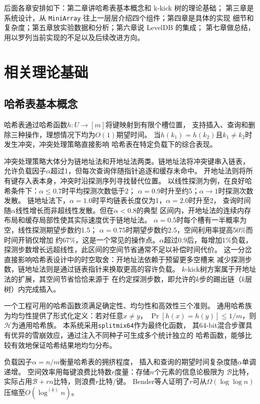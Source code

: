 \documentclass[
    type = bachelor,
    fontset = win,
    decl-page = true,
  ]{njuthesis}
\begin{document}
后面各章安排如下：第二章讲哈希表基本概念和 k-kick 树的理论基础；
第三章是系统设计，从 \texttt{MiniArray} 往上一层层介绍四个组件；第四章是具体的实现
细节和复杂度；第五章放实验数据和分析；第六章说 LevelDB 的集成；
第七章做总结，用以罗列当前实现的不足以及后续改进方向。

\chapter{相关理论基础}

\section{哈希表基本概念}

哈希表通过哈希函数$h: U \rightarrow [m]$将键映射到有限个槽位置，
支持插入、查询和删除三种操作，理想情况下均为$O(1)$期望时间。
当$h(k_1)=h(k_2)$且$k_1\neq k_2$时发生冲突，冲突处理策略直接影响
哈希表在特定负载下的综合表现。

冲突处理策略大体分为链地址法和开地址法两类。链地址法将冲突键串入链表，
允许负载因子$\alpha$超过1，但每次查询伴随指针追逐和缓存未命中。
开地址法则将所有键存入表本身，冲突时沿探测序列寻找替代位置。
以线性探测为例，在良好哈希条件下：$\alpha\le 0.7$时平均探测次数低于2；
$\alpha=0.9$时升至约5；$\alpha\to 1$时探测次数发散\cite{22}。
链地址法下，$\alpha=1.0$时平均链表长度仅为1，$\alpha=2.0$时升至2，
查询时间随$\alpha$线性增长而非超线性发散。但在$\alpha<0.8$的典型
区间内，开地址法的连续内存布局和缓存局部性使其实际速度优于链地址法。
$\alpha=0.5$时每个槽有一半概率为空，线性探测期望步数约1.5；
$\alpha=0.75$时期望步数约2.5，空间利用率提高50\%而时间开销仅增加
约67\%，这是一个常见的操作点。$\alpha$超过0.9后，每增加1\%负载，
探测步数增长远超线性，此区间的空间节省通常不足以补偿时间代价。
这一分岔直接影响哈希表设计中的时空取舍：开地址法依赖于预留更多空槽来
减少探测步数，链地址法则是通过链表指针来换取更高的容许负载。
$k$-kick树方案\cite{1}属于开地址法的扩展，其空间节省恰恰来源于
在约定探测步数，即允许的$k$步的踢出链（$k$层树）内完成插入。

一个工程可用的哈希函数须满足确定性、均匀性和高效性三个准则。
通用哈希族\cite{9,20}为均匀性提供了形式化定义：若对任意$x\neq y$，
$\Pr[h(x)=h(y)]\le 1/m$，则$\mathcal{H}$为通用哈希族。
本系统采用\texttt{splitmix64}\cite{5}作为最终化函数，
其64-bit混合步骤具有优异的雪崩效应\cite{21}，通过注入不同种子可生成多个统计独立的
哈希函数\cite{9,6}，能够比较有效地保证哈希结果地均匀分布。

负载因子$\alpha=n/m$衡量哈希表的拥挤程度，
插入和查询的期望时间复杂度随$\alpha$单调递增。
空间效率用每键浪费比特数$r$度量：存储$n$个元素的信息论极限为
$\mathcal{B}$比特，实际占用$\mathcal{B}+rn$比特，则浪费$r$比特/键。
Bender等人\cite{1}证明了$r$可从$\Omega(\log\log n)$
压缩至$O(\log^{(k)} n)$。
\end{document}
